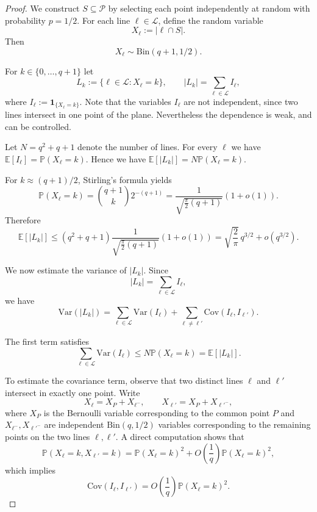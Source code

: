 \documentclass[10pt]{article}
\newcommand{\cL}{\mathcal{L}}
\newcommand{\E}{\mathbb{E}}
\theoremstyle{definition}
\begin{document}
	
	
	
	\iffalse
	
	\begin{proof}
		
		We construct $ S \subseteq \mathcal{P} $ by selecting each point independently at random with probability $ p = 1/2 $. 
		For each line $ \ell \in \mathcal{L} $, define the random variable
		\[
		X_{\ell} := |\ell \cap S|.
		\]
		Then
		\[
		X_{\ell} \sim \mathrm{Bin}(q+1,1/2).
		\]
		
		For $k\in\{0,\dots,q+1\}$ let
		\[
		L_k := \{\ell\in\mathcal L : X_{\ell}=k\},
		\qquad 
		|L_k| = \sum_{\ell\in\mathcal L} I_{\ell} ,
		\]
		where $I_{\ell} := \mathbf 1_{\{X_{\ell}=k\}}$.
		Note that the variables $I_{\ell}$ are not independent, since two lines intersect in one point of the plane. 
		Nevertheless the dependence is weak, and can be controlled.
		
		Let $N=q^2+q+1$ denote the number of lines.
		For every $\ell$ we have
		$
		\E[I_{\ell}] = \mathbb{P}(X_{\ell}=k).
		$
		Hence we have 
		$\E[|L_k|] = N \mathbb{P}(X_{\ell}=k).$
		
		For $k\approx (q+1)/2$, Stirling's formula yields
		\[
		\mathbb{P}(X_{\ell}=k)
		=
		\binom{q+1}{k}2^{-(q+1)}
		=
		\frac{1}{\sqrt{\frac{\pi}{2}(q+1)}}(1+o(1)).
		\]
		Therefore
		\[
		\E[|L_k|]
		\le
		(q^2+q+1)\frac{1}{\sqrt{\frac{\pi}{2}(q+1)}} {(1+o(1))}
		=
		\sqrt{\frac{2}{\pi}}\,q^{3/2}+o(q^{3/2}).
		\]
		
		\medskip
		
		We now estimate the variance of $|L_k|$.
		Since
		\[
		|L_k|=\sum_{\ell\in \cL} I_{\ell},
		\]
		we have
		\[
		\mathrm{Var}(|L_k|)
		=
		\sum_{\ell\in \cL}\mathrm{Var}(I_{\ell})
		+
		\sum_{\ell\neq \ell'}\mathrm{Cov}(I_{\ell},I_{\ell'}).
		\]
		
		The first term satisfies
		\[
		\sum_{\ell\in \cL}\mathrm{Var}(I_{\ell})
		\le
		N\mathbb{P}(X_{\ell}=k)
		=
		\mathbb E[|L_k|].
		\]
		
		To estimate the covariance term, observe that two distinct lines
		$\ell$ and $\ell'$ intersect in exactly one point.
		Write
		\[
		X_{\ell} = X_P + X_{\ell^-}, \qquad X_{\ell'} = X_P + X_{\ell'^-},
		\]
		where $X_P$ is the Bernoulli variable corresponding to the common point $P$
		and $X_{\ell^-}, X_{\ell'^-}$ are independent $\mathrm{Bin}(q,1/2)$ variables corresponding
		to the remaining points on the two lines $\ell, \ell'$.
		A direct computation shows that
		\[
		\mathbb{P}(X_{\ell}=k, X_{\ell'}=k)
		=
		\mathbb{P}(X_{\ell}=k)^2 + O\!\left(\frac{1}{q}\right)\mathbb{P}(X_{\ell}=k)^2,
		\]
		which implies
		\[
		\mathrm{Cov}(I_{\ell},I_{\ell'})
		=
		O\!\left(\frac{1}{q}\right)\mathbb{P}(X_{\ell}=k)^2.
		\]
		

\end{proof}
\end{document}
